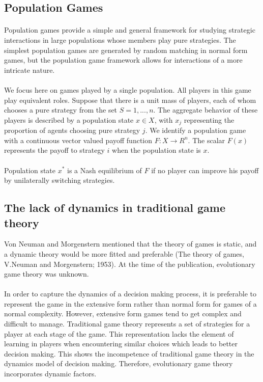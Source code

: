 \subsection{Population Games}
\paragraph{}Population games provide a simple and general framework for studying strategic interactions in large populations whose members play pure strategies. The simplest population games are generated by random matching in normal form games, but the population game framework allows for interactions of a more intricate nature.
\paragraph{}We focus here on games played by a single population. All players in this game play equivalent roles. Suppose that there is a unit mass of players, each of whom chooses a pure strategy from the set
 $S = {1, ... , n}$. The aggregate behavior of these players is described by a population state $x \in X$, with $x_j$ representing the proportion of agents choosing pure strategy $j$. We identify a population game with a continuous vector valued payoff function $ F:X \rightarrow R^n$. The scalar $F(x)$ represents the payoff to strategy $i$ when the population state is $x$.
\paragraph{}Population state $x^*$ is a Nash equilibrium of $F$ if no player can improve his payoff by unilaterally switching strategies.
\subsection{The lack of dynamics in traditional game theory}
Von Neuman and Morgenstern mentioned that the theory of games is static, and a dynamic theory would be more fitted and preferable (The theory of games, V.Neuman and Morgenstern; 1953). At the time of the publication, evolutionary game theory was unknown.
\paragraph{}
In order to capture the dynamics of a decision making process, it is preferable to represent the game in the extensive form rather than normal form for games of a normal complexity. However, extensive form games tend to get complex and difficult to manage. Traditional game theory represents a set of strategies for a player at each stage of the game. This representation lacks the element of learning in players when encountering similar choices which leads to better decision making. This shows the incompetence of traditional game theory in the dynamics model of decision making. Therefore, evolutionary game theory incorporates dynamic factors.
